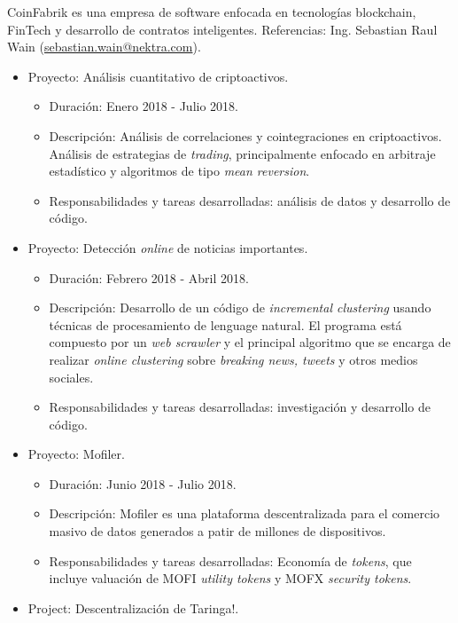 \documentclass[11pt,a4paper,sans]{moderncv}        %
\begin{document}
{CoinFabrik es una empresa de software enfocada en tecnologías blockchain, FinTech y desarrollo de contratos inteligentes.
Referencias: Ing. Sebastian Raul Wain (\href{mailto:sebastian.wain@nektra.com}{sebastian.wain@nektra.com}).
\begin{itemize}%
\item Proyecto: Análisis cuantitativo de criptoactivos.
	\begin{itemize}%
	\item Duración: Enero 2018 - Julio 2018.
	\item Descripción: Análisis de correlaciones y cointegraciones en criptoactivos. 
	Análisis de estrategias de \textit{trading}, principalmente enfocado en arbitraje estadístico y algoritmos de tipo \textit{mean reversion}.	
	\item Responsabilidades y tareas desarrolladas: análisis de datos y desarrollo de código.
	\end{itemize}
\item Proyecto: Detección \textit{online} de noticias importantes.
	\begin{itemize}%
	\item Duración: Febrero 2018 - Abril 2018.
	\item Descripción: Desarrollo de un código de \textit{incremental clustering} usando técnicas de procesamiento de lenguage natural.
	El programa está compuesto por un \textit{web scrawler} y el principal algoritmo que se encarga de realizar \textit{online clustering} sobre \textit{breaking news,
	tweets} y otros medios sociales.
	\item Responsabilidades y tareas desarrolladas: investigación y desarrollo de código.
	\end{itemize}
\item Proyecto: Mofiler.
	\begin{itemize}%
	\item Duración: Junio 2018 - Julio 2018.
	\item Descripción: Mofiler es una plataforma descentralizada para el comercio masivo de datos generados a patir de millones de dispositivos.	
	\item Responsabilidades y tareas desarrolladas: Economía de \textit{tokens}, que incluye valuación de MOFI \textit{utility tokens} y MOFX \textit{security tokens}.
	\end{itemize}
\item Project: Descentralización de Taringa!.
	\begin{itemize}%

\end{itemize}
\end{itemize}}
\end{document}

